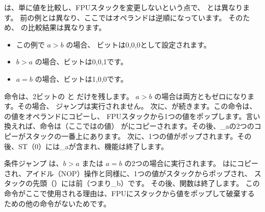 ﻿




\FCOM は、単に値を比較し、FPUスタックを変更しないという点で、 \FCOMP とは異なります。
前の例とは異なり、ここではオペランドは逆順になっています。
そのため、 \CThreeBits の比較結果は異なります。

\begin{itemize}
\item この例で $a>b$ の場合、 \CThreeBits ビットは0,0,0として設定されます。
\item $b>a$ の場合、ビットは0,0,1です。
\item $a=b$ の場合、ビットは1,0,0です。
\end{itemize}

命令は、2ビットの \Cthree と \Czero だけを残します。
$a>b$ の場合は両方ともゼロになります。その場合、 \JNE ジャンプは実行されません。
次に、が続きます。この命令は、の値をオペランドにコピーし、
FPUスタックから1つの値をポップします。言い換えれば、命令は（ここではの値）
がにコピーされます。その後、{\_a}の2つのコピーがスタックの一番上にあります。
次に、1つの値がポップされます。その後、ST（0）には{\_a}が含まれ、機能は終了します。

条件ジャンプ \JNE は、$b>a$ または $a=b$ の2つの場合に実行されます。 
はにコピーされ、アイドル（\ac{NOP}）操作と同様に、1つの値がスタックからポップされ、
スタックの先頭（）には前（つまり{\_b}）です。
その後、関数は終了します。
この命令がここで使用される理由は、\ac{FPU}にスタックから値をポップして破棄するための他の命令がないためです。


